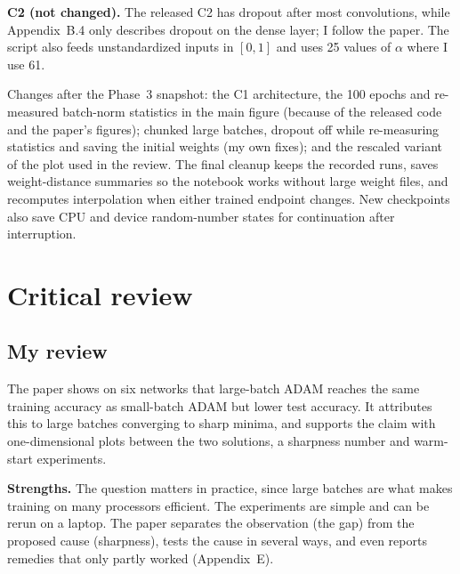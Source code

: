 \textbf{C2 (not changed).} The released C2 has dropout after most convolutions, while Appendix~B.4 only describes dropout on the dense layer; I follow the paper. The script also feeds unstandardized inputs in $[0,1]$ and uses 25 values of $\alpha$ where I use 61.

Changes after the Phase~3 snapshot: the C1 architecture, the 100 epochs and re-measured batch-norm statistics in the main figure (because of the released code and the paper's figures); chunked large batches, dropout off while re-measuring statistics and saving the initial weights (my own fixes); and the rescaled variant of the plot used in the review. The final cleanup keeps the recorded runs, saves weight-distance summaries so the notebook works without large weight files, and recomputes interpolation when either trained endpoint changes. New checkpoints also save CPU and device random-number states for continuation after interruption.

\section{Critical review}

\subsection{My review}\label{sec:review}
The paper shows on six networks that large-batch ADAM reaches the same training accuracy as small-batch ADAM but lower test accuracy. It attributes this to large batches converging to sharp minima, and supports the claim with one-dimensional plots between the two solutions, a sharpness number and warm-start experiments.

\textbf{Strengths.} The question matters in practice, since large batches are what makes training on many processors efficient. The experiments are simple and can be rerun on a laptop. The paper separates the observation (the gap) from the proposed cause (sharpness), tests the cause in several ways, and even reports remedies that only partly worked (Appendix~E).

